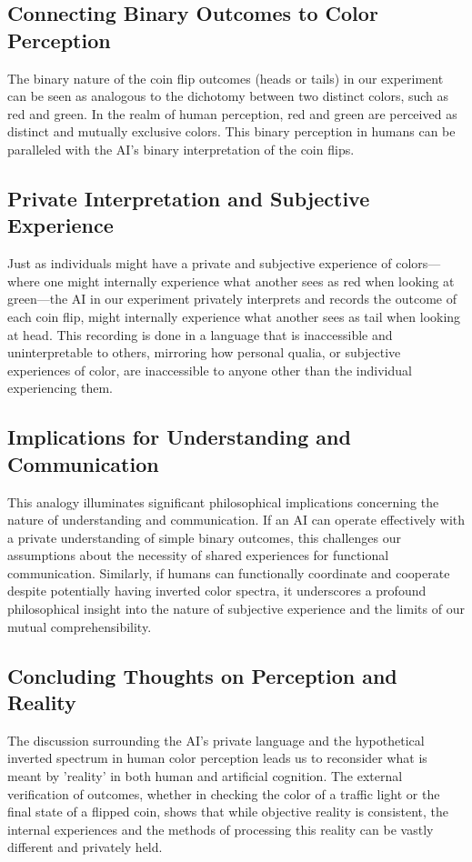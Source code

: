 \documentclass[12pt]{article}
\begin{document}
\subsection{Connecting Binary Outcomes to Color Perception}
The binary nature of the coin flip outcomes (heads or tails) in our experiment can be seen as analogous to the dichotomy between two distinct colors, such as red and green. In the realm of human perception, red and green are perceived as distinct and mutually exclusive colors. This binary perception in humans can be paralleled with the AI's binary interpretation of the coin flips.

\subsection{Private Interpretation and Subjective Experience}
Just as individuals might have a private and subjective experience of colors---where one might internally experience what another sees as red when looking at green---the AI in our experiment privately interprets and records the outcome of each coin flip, might internally experience what another sees as tail when looking at head. This recording is done in a language that is inaccessible and uninterpretable to others, mirroring how personal qualia, or subjective experiences of color, are inaccessible to anyone other than the individual experiencing them.

\subsection{Implications for Understanding and Communication}
This analogy illuminates significant philosophical implications concerning the nature of understanding and communication. If an AI can operate effectively with a private understanding of simple binary outcomes, this challenges our assumptions about the necessity of shared experiences for functional communication. Similarly, if humans can functionally coordinate and cooperate despite potentially having inverted color spectra, it underscores a profound philosophical insight into the nature of subjective experience and the limits of our mutual comprehensibility.

\subsection{Concluding Thoughts on Perception and Reality}
The discussion surrounding the AI's private language and the hypothetical inverted spectrum in human color perception leads us to reconsider what is meant by 'reality' in both human and artificial cognition. The external verification of outcomes, whether in checking the color of a traffic light or the final state of a flipped coin, shows that while objective reality is consistent, the internal experiences and the methods of processing this reality can be vastly different and privately held.
\end{document}
